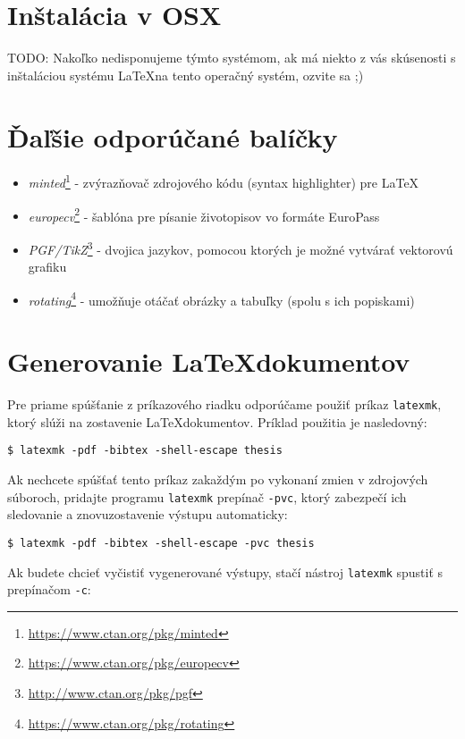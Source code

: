 \section{Inštalácia v OSX}

TODO: Nakoľko nedisponujeme týmto systémom, ak má niekto z vás skúsenosti s inštaláciou systému \LaTeX na tento operačný systém, ozvite sa ;)


\section{Ďaľšie odporúčané balíčky}
\begin{itemize}
    \item \emph{minted}\footnote{\url{https://www.ctan.org/pkg/minted}} - zvýrazňovač zdrojového kódu (syntax highlighter) pre \LaTeX 
    \item \emph{europecv}\footnote{\url{https://www.ctan.org/pkg/europecv}} - šablóna pre písanie životopisov vo formáte EuroPass 
    \item \emph{PGF/TikZ}\footnote{\url{http://www.ctan.org/pkg/pgf}} - dvojica jazykov, pomocou ktorých je možné vytvárať vektorovú grafiku 
    \item \emph{rotating}\footnote{\url{https://www.ctan.org/pkg/rotating}} - umožňuje otáčať obrázky a tabuľky (spolu s ich popiskami)
\end{itemize}


\section{Generovanie \LaTeX dokumentov}

Pre priame spúšťanie z príkazového riadku odporúčame použiť príkaz {\tt latexmk}, ktorý slúži na zostavenie  \LaTeX dokumentov. Príklad použitia je nasledovný:

\begin{verbatim}
$ latexmk -pdf -bibtex -shell-escape thesis
\end{verbatim}

Ak nechcete spúšťať tento príkaz zakaždým po vykonaní zmien v zdrojových súboroch, pridajte programu {\tt latexmk} prepínač {\tt -pvc}, ktorý zabezpečí ich sledovanie a znovuzostavenie výstupu automaticky:

\begin{verbatim}
$ latexmk -pdf -bibtex -shell-escape -pvc thesis
\end{verbatim}

Ak budete chcieť vyčistiť vygenerované výstupy, stačí nástroj {\tt latexmk} spustiť s prepínačom {\tt -c}:

